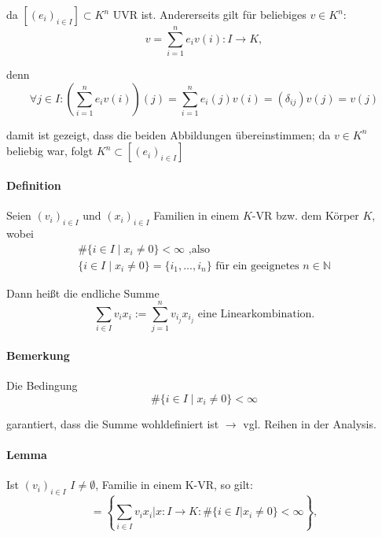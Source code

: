 	da $[(e_i)_{i\in I}] \subset K^n$ UVR ist. Andererseits gilt für beliebiges $v\in K^n$:
	\begin{equation*}
		v=\sum^n_{i=1}e_iv(i): I\to K,
	\end{equation*}
	
	denn
	\begin{equation*}
		\forall j\in I: \left(\sum^n_{i=1} e_iv(i)\right)(j) = \sum^n_{i=1}e_i(j)v(i) = (\delta_{ij}) v(j) = v(j)
	\end{equation*}

	damit ist gezeigt, dass die beiden Abbildungen übereinstimmen; da $v\in K^n$ beliebig war, folgt $K^n \subset [(e_i)_{i\in I}]$
	
\paragraph{Definition}
	Seien $(v_i)_{i\in I}$ und $(x_i)_{i\in I}$ Familien in einem $ K $-VR bzw. dem Körper $ K $, wobei
	\begin{gather*}
		\# \{i\in I\mid x_i \neq 0\} < \infty\text{ ,also}\\
		\{ i\in I \mid x_i \neq 0\} = \{i_1,...,i_n\}\text{ für ein geeignetes } n\in \mathbb{N}
	\end{gather*}
	
	
	Dann heißt die endliche Summe
	\begin{equation*}
    	\sum_{i\in I} v_ix_i:= \sum^n_{j=1}v_{i_j}x_{i_j}\text{ eine Linearkombination.}
	\end{equation*}

\paragraph{Bemerkung}
	Die Bedingung
	\begin{equation*}
		\#\{i\in I \mid x_i\neq 0\} <\infty
	\end{equation*}
	
	garantiert, dass die Summe wohldefiniert ist $\rightarrow$ vgl. Reihen in der Analysis.
		
\paragraph{Lemma}
	Ist $(v_i)_{i\in I}$ $I \neq \emptyset$, Familie in einem K-VR, so gilt: 
	\begin{equation*}
		[(v_i)_{i\in I}] = \left\{\sum_{i\in I} v_ix_i| x: I\to K: \# \{i\in I| x_i \neq 0\}< \infty\right\},
	\end{equation*}
	
